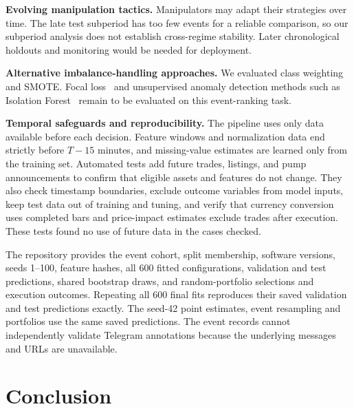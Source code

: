 \documentclass{ieeeaccess}
\begin{document}
\textbf{Evolving manipulation tactics.}
Manipulators may adapt their strategies over time. \textcolor{revisionblue}{The late test} subperiod \textcolor{revisionblue}{has too few events for a reliable comparison, so our subperiod} analysis \textcolor{revisionblue}{does not establish} cross-regime \textcolor{revisionblue}{stability. Later chronological holdouts} and monitoring would be \textcolor{revisionblue}{needed} for deployment.

\textbf{Alternative imbalance-handling approaches.}
\textcolor{revisionblue}{We evaluated} class \textcolor{revisionblue}{weighting~\cite{elkan2001cost}} and \textcolor{revisionblue}{SMOTE. Focal} loss~\cite{lin2017focal} and \textcolor{revisionblue}{unsupervised} anomaly \textcolor{revisionblue}{detection methods such as Isolation Forest~}\cite{liu2008isolation} remain \textcolor{revisionblue}{to be evaluated on} this \textcolor{revisionblue}{event-ranking task.}

\textcolor{revisionblue}{\textbf{Temporal safeguards and reproducibility.}}
\textcolor{revisionblue}{The pipeline uses only data available before each decision. Feature windows and normalization data end strictly before $T-15$ minutes, and missing-value estimates are learned only from the training set. Automated tests add future trades, listings, and pump announcements to confirm that eligible assets and features do not change. They also check timestamp boundaries, exclude outcome variables from model inputs, keep test data out of training and tuning, and verify that currency conversion uses completed bars and price-impact estimates exclude trades after execution. These tests found no use of future data in the cases checked.}

\textcolor{revisionblue}{The repository provides the event cohort, split membership, software versions, seeds 1--100, feature hashes, all 600 fitted configurations, validation and test predictions, shared bootstrap draws, and random-portfolio selections and execution outcomes. Repeating all 600 final fits reproduces their saved validation and test predictions exactly. The seed-42 point estimates, event resampling and portfolios use the same saved predictions. The event records cannot independently validate Telegram annotations because the underlying messages and URLs are unavailable.}


\FloatBarrier %
\section{Conclusion}
\end{document}
